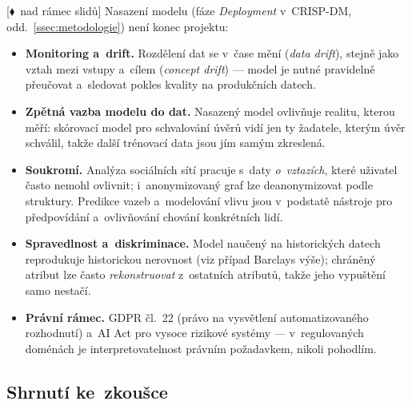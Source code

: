 \documentclass[11pt,a4paper]{article}
\theoremstyle{definition}
\newcommand{\mimo}{\textcolor{markcol}{\textsf{\footnotesize[$\blacklozenge$~nad rámec slidů]}}}
\begin{document}
\mimo{} Nasazení modelu (fáze \emph{Deployment} v~CRISP-DM, odd.~\ref{ssec:metodologie}) není
konec projektu:
\begin{itemize}
\item \textbf{Monitoring a~drift.} Rozdělení dat se v~čase mění (\emph{data drift}), stejně
      jako vztah mezi vstupy a~cílem (\emph{concept drift}) --- model je nutné pravidelně
      přeučovat a~sledovat pokles kvality na produkčních datech.
\item \textbf{Zpětná vazba modelu do dat.} Nasazený model ovlivňuje realitu, kterou měří:
      skórovací model pro schvalování úvěrů vidí jen ty žadatele, kterým úvěr schválil, takže
      další trénovací data jsou jím samým zkreslená.
\item \textbf{Soukromí.} Analýza sociálních sítí pracuje s~daty \emph{o~vztazích}, které
      uživatel často nemohl ovlivnit; i~anonymizovaný graf lze deanonymizovat podle struktury.
      Predikce vazeb a~modelování vlivu jsou v~podstatě nástroje pro předpovídání a~ovlivňování
      chování konkrétních lidí.
\item \textbf{Spravedlnost a~diskriminace.} Model naučený na historických datech reprodukuje
      historickou nerovnost (viz případ Barclays výše); chráněný atribut lze často
      \emph{rekonstruovat} z~ostatních atributů, takže jeho vypuštění samo nestačí.
\item \textbf{Právní rámec.} GDPR čl.~22 (právo na vysvětlení automatizovaného rozhodnutí)
      a~AI Act pro vysoce rizikové systémy --- v~regulovaných doménách je interpretovatelnost
      právním požadavkem, nikoli pohodlím.
\end{itemize}

\subsection{Shrnutí ke~zkoušce}
\end{document}
